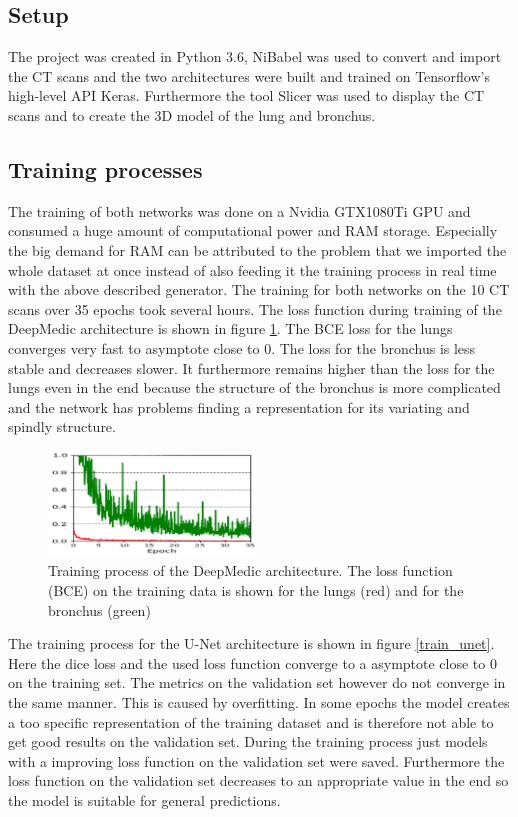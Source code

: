 
\subsection{Setup}

The project was created in Python 3.6, NiBabel was used to convert and import the CT scans and the two architectures were built and trained on Tensorflow's high-level API Keras. Furthermore the tool Slicer was used to display the CT scans and to create the 3D model of the lung and bronchus.

\subsection{Training processes}
The training of both networks was done on a Nvidia GTX1080Ti GPU and consumed a huge amount of computational power and RAM storage. Especially the big demand for RAM can be attributed to the problem that we imported the whole dataset at once instead of also feeding it the training process in real time with the above described generator. The training for both networks on the 10 CT scans over 35 epochs took several hours.\newline 
The loss function during training of the DeepMedic architecture is shown in figure \ref{train_deepmedic}. The BCE loss for the lungs converges very fast to asymptote close to 0. The loss for the bronchus is less stable and decreases slower. It furthermore remains higher than the loss for the lungs even in the end because the structure of the bronchus is more complicated and the network has problems finding a representation for its variating and spindly structure.\newline
\begin{figure}[h!]
	\includegraphics[width=0.49\textwidth, angle=0]{files/deepmedictrain.png}
	\caption{Training process of the DeepMedic architecture. The loss function (BCE) on the training data is shown for the lungs (red) and for the bronchus (green)}
	\label{train_deepmedic}
\end{figure}

The training process for the U-Net architecture is shown in figure \ref{train_unet}. Here the dice loss and the used loss function converge to a asymptote close to 0 on the training set. The metrics on the validation set however do not converge in the same manner. This is caused by overfitting. In some epochs the model creates a too specific representation of the training dataset and is therefore not able to get good results on the validation set. During the training process just models with a improving loss function on the validation set were saved. Furthermore the loss function on the validation set decreases to an appropriate value in the end so the model is suitable for general predictions. 

